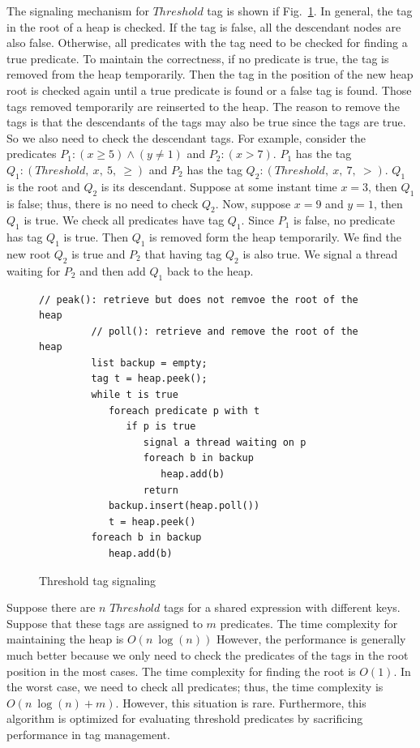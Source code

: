 \documentclass[preprint]{sigplanconf}
\begin{document}
The signaling mechanism for $Threshold$ tag is shown if Fig.~\ref{fig:th_sig}. In
general, the tag in the root of a heap is checked. If the tag is false, all the
descendant nodes are also false. Otherwise, all predicates with the tag
need to be checked for finding a true predicate. To maintain the correctness, 
if no predicate is true, the tag is removed from the heap temporarily. Then the
tag in the position of the new heap root is checked again until a true predicate is found or a
false tag is found. Those tags removed temporarily are reinserted to the heap.
The reason to remove the tags is that the descendants of the tags may also be
true since the tags are true. So we also need to check the descendant tags. For
example, consider the predicates $P_1: (x \ge 5) \wedge (y \ne 1)$ and 
$P_2: (x > 7)$. $P_1$ has the tag $Q_1: (Threshold,\ x,\ 5,\ \ge)$ and $P_2$
has the tag $Q_2: (Threshold,\ x,\ 7,\ >)$. $Q_1$ is the root and $Q_2$ is its
descendant. Suppose at some instant time $x=3$, then $Q_1$ is false; thus, there is no
need to check $Q_2$. Now, suppose $x = 9$ and $y = 1$, then $Q_1$ is true. We
check all predicates have tag $Q_1$.  Since $P_1$ is false, no predicate has
tag $Q_1$ is true. Then $Q_1$ is removed form the heap temporarily. We find the
new root $Q_2$ is true and $P_2$ that having tag $Q_2$ is also true. We signal 
a thread waiting for $P_2$ and then add $Q_1$ back to the heap. 

\begin{figure}[ht!]
    \begin{Verbatim}[fontsize=\footnotesize,gobble=8,frame=lines,
            framesep=3mm]
         // peak(): retrieve but does not remvoe the root of the heap 
         // poll(): retrieve and remove the root of the heap
         list backup = empty;
         tag t = heap.peek();
         while t is true
            foreach predicate p with t
               if p is true
                  signal a thread waiting on p
                  foreach b in backup 
                     heap.add(b)
                  return 
            backup.insert(heap.poll())
            t = heap.peek()
         foreach b in backup 
            heap.add(b)
    \end{Verbatim}
  \caption{Threshold tag signaling}
  \label{fig:th_sig}
\end{figure}


Suppose there are $n$ $Threshold$ tags for a shared expression with different 
keys. Suppose that these tags are assigned to $m$ predicates. The time 
complexity for maintaining the heap is $O(n\ \log(n))$ 
However, the performance is generally much better because we only
need to check the predicates of the tags in the root position in the most
cases. The time complexity for finding the root is $O(1)$. In the worst case, 
we need to check all predicates; thus, the time complexity is $O(n\ \log(n) + m)$. 
However, this situation is rare. Furthermore, this algorithm is optimized for
evaluating threshold predicates by sacrificing performance in tag management.  
\end{document}
